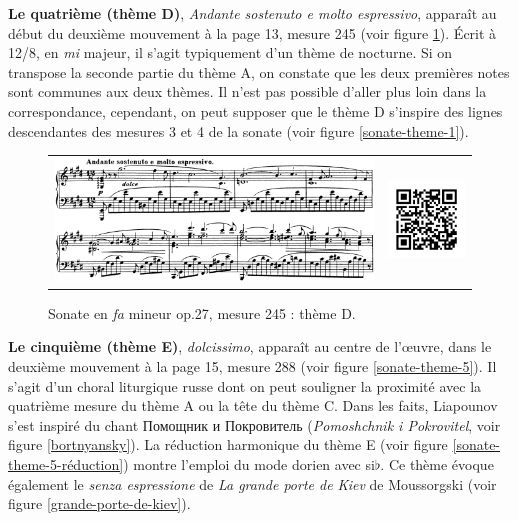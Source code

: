 \textbf{Le quatrième (thème D)}, \emph{Andante sostenuto e molto espressivo}, apparaît au début du deuxième mouvement à la page 13, mesure 245 (voir figure \ref{sonate-theme-4}). Écrit à 12/8, en \emph{mi} majeur, il s'agit typiquement d'un thème de nocturne. Si on transpose la seconde partie du thème A, on constate que les deux premières notes sont communes aux deux thèmes. Il n'est pas possible d'aller plus loin dans la correspondance, cependant, on peut supposer que le thème D s'inspire des lignes descendantes des mesures 3 et 4 de la sonate (voir figure \ref{sonate-theme-1}).

\begin{figure}[!ht]
  \begin{bigcenter}
    \begin{tabular}{lr}
      \includegraphics[width=12.5cm, keepaspectratio]{sonate-theme-D.png}
      &
      \includegraphics[width=3cm, keepaspectratio]{op1-qr.png}
    \end{tabular}
  \end{bigcenter}
  \caption{\label{sonate-theme-4}Sonate en \emph{fa} mineur op.27, mesure 245 : thème D.}
\end{figure}

\textbf{Le cinquième (thème E)}, \emph{dolcissimo},  apparaît au centre de l'œuvre, dans le deuxième mouvement à la page 15, mesure 288 (voir figure \ref{sonate-theme-5}). Il s'agit d'un choral liturgique russe dont on peut souligner la proximité avec la quatrième mesure du thème A ou la tête du thème C. Dans les faits, Liapounov s'est inspiré du chant \foreignlanguage{russian}{Помощник и Покровитель} (\emph{Pomoshchnik i Pokrovitel}, voir figure \ref{bortnyansky}). La réduction harmonique du thème E (voir figure \ref{sonate-theme-5-réduction}) montre l'emploi du mode dorien avec si$\flat$. Ce thème évoque également le \emph{senza espressione} de \emph{La grande porte de Kiev} de Moussorgski (voir figure \ref{grande-porte-de-kiev}).\\

